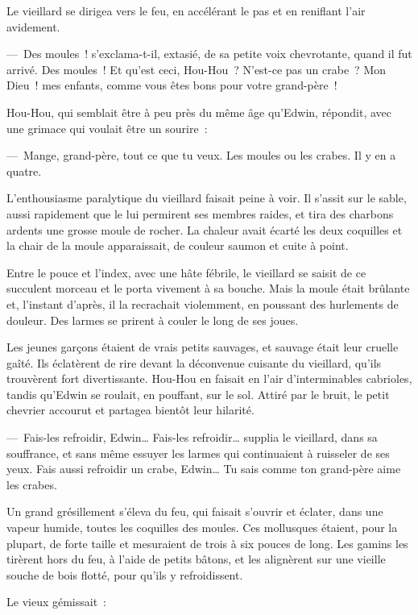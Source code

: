 \documentclass[french,twoside]{book} %
\begin{document}
Le vieillard se dirigea vers le feu, en accélérant le pas et en reniflant l’air avidement.\par
— Des moules ! s’exclama-t-il, extasié, de sa petite voix chevrotante, quand il fut arrivé. Des moules ! Et qu’est ceci, Hou-Hou ? N’est-ce pas un crabe ? Mon Dieu ! mes enfants, comme vous êtes bons pour votre grand-père !\par
Hou-Hou, qui semblait être à peu près du même âge qu’Edwin, répondit, avec une grimace qui voulait être un sourire :\par
— Mange, grand-père, tout ce que tu veux. Les moules ou les crabes. Il y en a quatre.\par
L’enthousiasme paralytique du vieillard faisait peine à voir. Il s’assit sur le sable, aussi rapidement que le lui permirent ses membres raides, et tira des charbons ardents une grosse moule de rocher. La chaleur avait écarté les deux coquilles et la chair de la moule apparaissait, de couleur saumon et cuite à point.\par
Entre le pouce et l’index, avec une hâte fébrile, le vieillard se saisit de ce succulent morceau et le porta vivement à sa bouche. Mais la moule était brûlante et, l’instant d’après, il la recrachait violemment, en poussant des hurlements de douleur. Des larmes se prirent à couler le long de ses joues.\par
Les jeunes garçons étaient de vrais petits sauvages, et sauvage était leur cruelle gaîté. Ils éclatèrent de rire devant la déconvenue cuisante du vieillard, qu’ils trouvèrent fort divertissante. Hou-Hou en faisait en l’air d’interminables cabrioles, tandis qu’Edwin se roulait, en pouffant, sur le sol. Attiré par le bruit, le petit chevrier accourut et partagea bientôt leur hilarité.\par
— Fais-les refroidir, Edwin… Fais-les refroidir… supplia le vieillard, dans sa souffrance, et sans même essuyer les larmes qui continuaient à ruisseler de ses yeux. Fais aussi refroidir un crabe, Edwin… Tu sais comme ton grand-père aime les crabes.\par
Un grand grésillement s’éleva du feu, qui faisait s’ouvrir et éclater, dans une vapeur humide, toutes les coquilles des moules. Ces mollusques étaient, pour la plupart, de forte taille et mesuraient de trois à six pouces de long. Les gamins les tirèrent hors du feu, à l’aide de petits bâtons, et les alignèrent sur une vieille souche de bois flotté, pour qu’ils y refroidissent.\par
Le vieux gémissait :\par
\end{document}

